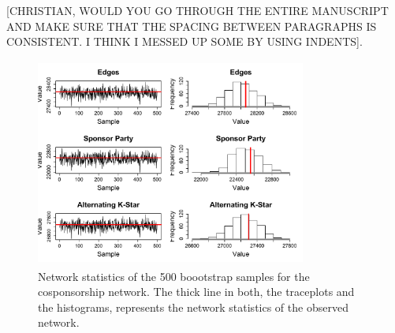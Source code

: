 \documentclass[10pt, conference, compsocconf]{IEEEtran}
\begin{document}
[CHRISTIAN, WOULD YOU GO THROUGH THE ENTIRE MANUSCRIPT AND MAKE SURE THAT THE SPACING BETWEEN PARAGRAPHS IS CONSISTENT. I THINK I MESSED UP SOME BY USING INDENTS].
\begin{figure}[!t]
\centering
\includegraphics[width=3.5in, height=2.7in]{MPLE_histogram_traceplot_cosponsorship}
\caption{Network statistics of the 500 boootstrap samples for the cosponsorship network. The thick line in both, the traceplots and the histograms, represents the network statistics of the observed network. }
\label{diagnostics}
\end{figure}
\end{document}
